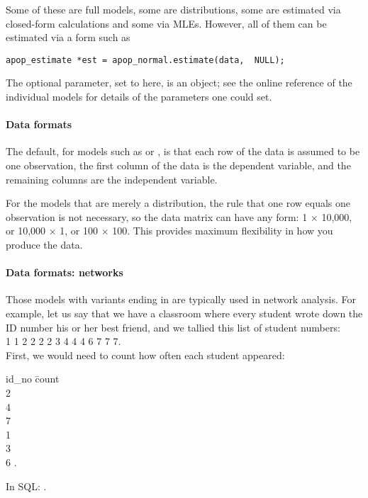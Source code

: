 Some of these are full models, some are distributions, some are
estimated via closed-form calculations and some via MLEs. However, all
of them can be estimated via a form such as
\begin{lstlisting}
apop_estimate *est = apop_normal.estimate(data,  NULL);
\end{lstlisting}

The optional parameter, set to  here,
is an  object; see
the online reference of the individual models for details of the
parameters one could set.

\paragraph{Data formats} \label{dataformats} 
The default, for models such as  or
, is that each row of the data is assumed to be one
observation, the first column of the data is the dependent
variable, and the remaining columns are the independent variable.

For the models that are merely a distribution, the rule that one row equals one observation is not necessary, so the data matrix can have
any form: 1 $\times$ 10,000, or 10,000 $\times$ 1, or 100 $\times$ 100.
This provides maximum flexibility in how you produce the data.

\paragraph{\treesymbol{} Data formats: networks} 
Those models with variants ending in  are typically used
in network analysis. For example, let us say that we have a classroom
where every student wrote down the ID number his or her best friend,
and we tallied this list of student numbers:\\
1 1 2 2 2 2 3 4 4 4 6 7 7 7.\\ 
First, we would need to count how often each student appeared:\\

\begin{tabbing}
id\_no \= count\\
2 \\
4 \\
7 \\
1 \\
3 \\
6 .
\end{tabbing}
In SQL: .

